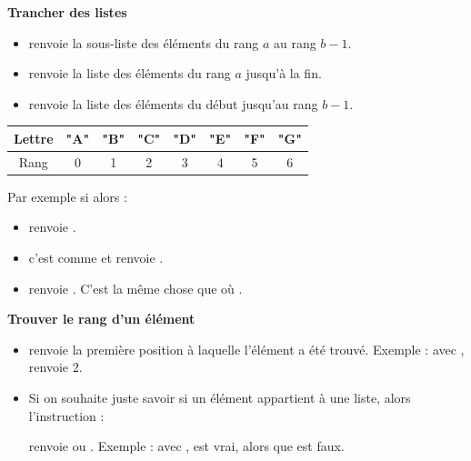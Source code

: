 \documentclass[11pt,class=report,crop=false]{standalone}
\begin{document}
\bigskip
    
\textbf{Trancher des listes}
  
  \begin{itemize}
    \item {} \quad renvoie la sous-liste des éléments du rang $a$ au rang $b-1$.
    
    \item {} \quad renvoie la liste des éléments du rang $a$ jusqu'à la fin.
      
    \item {} \quad renvoie la liste des éléments du début jusqu'au rang $b-1$.
    

\end{itemize}


\medskip
 \begin{center}
\begin{tabular}{|c||c|c|c|c|c|c|c|}
\hline
Lettre & \textbf{"A"} & \textbf{"B"} & \textbf{"C"} & \textbf{"D"} & \textbf{"E"} & \textbf{"F"} & \textbf{"G"} \\ \hline
Rang & 0 & 1 & 2 & 3 & 4 & 5 & 6 \\ \hline
\end{tabular}
\end{center}
\medskip
  
    Par exemple si  alors :
  \begin{itemize}
    \item {} \quad renvoie \ci{["B","C","D"]}.
    \item {} \quad c'est comme  et renvoie \ci{["A","B"]}.   
    \item {} \quad renvoie \ci{["E","F","G"]}.  C'est la même chose 
     que  où .
  \end{itemize} 

\bigskip

\textbf{Trouver le rang d'un élément} 

\begin{itemize}

    \item   
    renvoie la première position à laquelle l'élément a été trouvé. Exemple : avec ,
    renvoie $2$.

  \item Si on souhaite juste savoir si un élément appartient à une liste, alors l'instruction :  
  
  renvoie  ou .
  Exemple : avec ,
   \og{}\fg{} est vrai, alors que \og{}\fg{} est faux.
  
\end{itemize}
\end{document}
